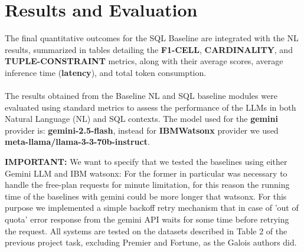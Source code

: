 \section{Results and Evaluation}
\label{sec:sql_nl_results_evaluation}
\vspace{2em}

The final quantitative outcomes for the SQL Baseline are integrated with the NL results, summarized in tables detailing the \textbf{F1-CELL}, \textbf{CARDINALITY}, and \textbf{TUPLE-CONSTRAINT} metrics, along with their average scores, average inference time (\textbf{latency}), and total token consumption.
\\\\
The results obtained from the Baseline NL and SQL baseline modules were evaluated using standard metrics to assess the performance of the LLMs in both Natural Language (NL) and SQL contexts.
The model used for the \textbf{gemini} provider is: \textbf{gemini-2.5-flash}, instead for \textbf{IBMWatsonx} provider we used \textbf{meta-llama/llama-3-3-70b-instruct}.


\textbf{IMPORTANT:} We want to specify that we tested the baselines using either Gemini LLM and IBM watsonx:
For the former in particular was necessary to handle the free-plan requests for minute limitation, for this reason the running time of the baselines with gemini could be more longer that watsonx.
For this purpose we implemented a simple backoff retry mechanism that in case of 'out of quota' error response from the gemini API waits for some time  before retrying the request.
All systems are tested on the datasets described in Table 2 of the previous project task, excluding Premier and Fortune, as the Galois authors did.
\vspace{2.5em}

